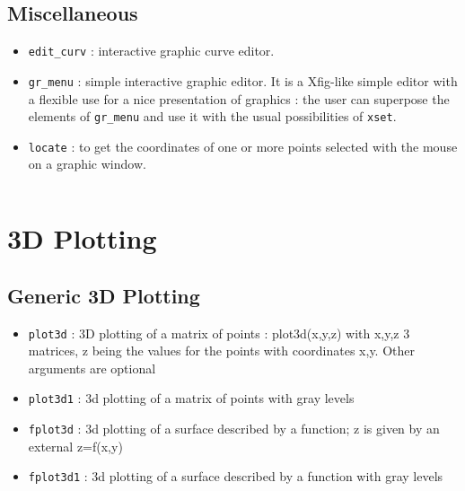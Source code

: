 \subsection{Miscellaneous}
%
\begin{itemize}
	\item  \verb+edit_curv+ : interactive graphic curve editor.

	\item  \verb+gr_menu+ 	: simple interactive graphic editor. It
is a Xfig-like simple editor with a flexible use for a nice
presentation of graphics : the user can superpose the elements of
\verb+gr_menu+ and use it with the usual possibilities of {\tt xset}.

	\item  \verb+locate+ 	: to get the coordinates of one or more 
points selected with the mouse on a graphic window.

\end{itemize}
% 

\begin{verbatim}

\end{verbatim}



\section{3D Plotting}
\subsection{Generic 3D Plotting}
%
\begin{itemize}
	\item  \verb+plot3d+ : 3D plotting of a matrix of points : plot3d(x,y,z) with x,y,z 3 matrices, z being the values for the points with coordinates x,y. Other
arguments are optional
	\item   \verb+plot3d1+ : 3d plotting	of a matrix of points with gray levels
	\item   \verb+fplot3d+ : 3d plotting	of a surface described by a function; z is given by an external z=f(x,y)
	\item   \verb+fplot3d1+ : 3d	plotting of a surface described	by a function with gray	levels
\end{itemize}
%
 
